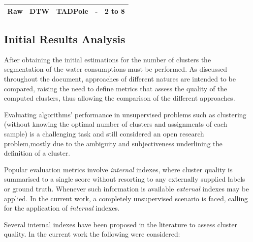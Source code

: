 \documentclass[9pt,journal,compsoc]{IEEEtran}
\begin{document}
\begin{table}[ht]
\begin{tabular}{|c|c|c|c|c|}
		Raw                                                     & DTW                                                       & TADPole                                                        & -                                                                & 2 to 8                                                       \\ \hline
	\end{tabular}
\end{table}


\subsection{Initial Results Analysis}

After obtaining the initial estimations for the number of clusters the segmentation of the water consumptions must be performed. As discussed throughout the document, approaches of different natures are intended to be compared, raising the need to define metrics that assess the quality of the computed clusters, thus allowing the comparison of the different approaches.

Evaluating algorithms' performance in unsupervised problems such as clustering (without knowing the optimal number of clusters and assignments of each sample) is a challenging task and still considered an open research problem\cite{aghabozorgi2015time},mostly due to the ambiguity and subjectiveness underlining the definition of a cluster.

Popular evaluation metrics involve \emph{internal} indexes, where cluster quality is summarised to a single score without resorting to any externally supplied labels or ground truth. Whenever such information is available \emph{external} indexes may be applied. In the current work, a completely unsupervised scenario is faced, calling for the application of \emph{internal} indexes.

Several internal indexes have been proposed in the literature to assess cluster quality. In the current work the following were considered:
\end{document}
